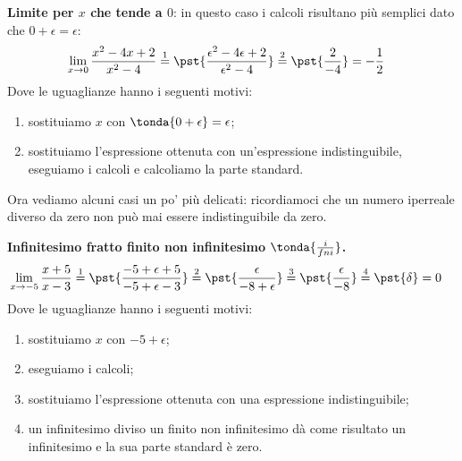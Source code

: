 \begin{esempio}
\textbf{Limite per \(x\) che tende a 
\(0\)}:
in questo caso i calcoli risultano più semplici dato che
\(0 + \epsilon = \epsilon\): 
\begin{align*}
\lim_{x \rightarrow 0} \frac{x^2-4x+2}{x^2-4} & \stackrel{1}{=} 
  \pst{\frac{\epsilon^2-4\epsilon+2}{\epsilon^2-4}} \stackrel{2}{=}  
  \pst{\frac{2}{-4}} = -\frac{1}{2}
\end{align*}
Dove le uguaglianze hanno i seguenti motivi:
\begin{enumerate} [nosep]
 \item sostituiamo \(x\) con \(\tonda{0+\epsilon}=\epsilon\);
 \item sostituiamo l'espressione ottenuta con un'espressione 
   indistinguibile, eseguiamo i calcoli e calcoliamo la parte standard.
\end{enumerate}
\end{esempio}

Ora vediamo alcuni casi un po' più delicati: ricordiamoci che un numero 
iperreale diverso da zero non può mai essere indistinguibile da zero.

\begin{esempio}
\textbf{Infinitesimo fratto finito non infinitesimo 
\(\tonda{\frac{i}{fni}}\).}
\begin{align*}
\lim_{x \rightarrow -5} \frac{x+5}{x-3} & \stackrel{1}{=} 
  \pst{\frac{-5+\epsilon+5}{-5+\epsilon-3}} \stackrel{2}{=}  
  \pst{\frac{\epsilon}{-8+\epsilon}} \stackrel{3}{=} 
  \pst{\frac{\epsilon}{-8}} \stackrel{4}{=} \pst{\delta} = 0
\end{align*}
Dove le uguaglianze hanno i seguenti motivi:
\begin{enumerate} [nosep]
 \item sostituiamo \(x\) con \(-5+\epsilon\);
 \item eseguiamo i calcoli;
 \item sostituiamo l'espressione ottenuta con una espressione 
   indistinguibile;
 \item un infinitesimo diviso un finito non infinitesimo dà come risultato 
un infinitesimo e la sua parte standard è zero.
\end{enumerate}
\end{esempio}

